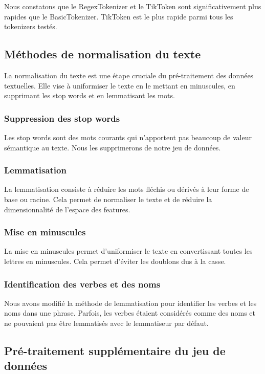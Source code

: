 Nous constatons que le RegexTokenizer et le TikToken sont significativement plus rapides que le BasicTokenizer. TikToken est le plus rapide parmi tous les tokenizers testés.

\subsection{Méthodes de normalisation du texte}

La normalisation du texte est une étape cruciale du pré-traitement des données textuelles. Elle vise à uniformiser le texte en le mettant en minuscules, en supprimant les stop words et en lemmatisant les mots.

\subsubsection*{Suppression des stop words}

Les stop words sont des mots courants qui n'apportent pas beaucoup de valeur sémantique au texte. Nous les supprimerons de notre jeu de données.

\subsubsection*{Lemmatisation}

La lemmatisation consiste à réduire les mots fléchis ou dérivés à leur forme de base ou racine. Cela permet de normaliser le texte et de réduire la dimensionnalité de l'espace des features.

\subsubsection*{Mise en minuscules}

La mise en minuscules permet d'uniformiser le texte en convertissant toutes les lettres en minuscules. Cela permet d'éviter les doublons dus à la casse.

\subsubsection*{Identification des verbes et des noms}

Nous avons modifié la méthode de lemmatisation pour identifier les verbes et les noms dans une phrase. Parfois, les verbes étaient considérés comme des noms et ne pouvaient pas être lemmatisés avec le lemmatiseur par défaut.

\subsection{Pré-traitement supplémentaire du jeu de données}


